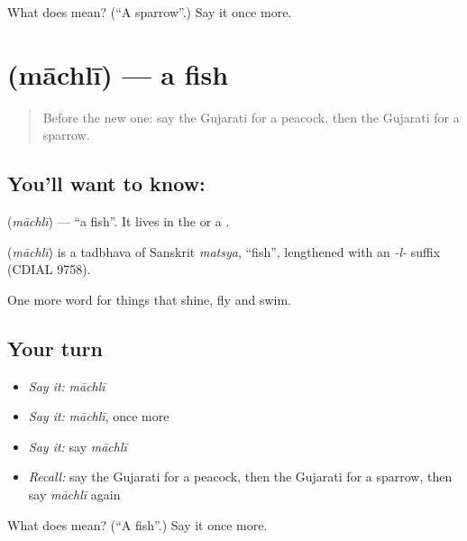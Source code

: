 \begin{tcolorbox}[breakable,colback=teal!4,colframe=teal!35!black,title={Before you move on}]
What does  mean? (\textquotedblleft{}A sparrow\textquotedblright{}.) Say it once more.
\end{tcolorbox}
\section[\texorpdfstring{\gu{માછલી} (māchlī)}{માછલી (māchlī)}]{ (māchlī) — a fish}

\label{lesson:GU-C69-fish}



\begin{quote}
Before the new one: say the Gujarati for a peacock, then the Gujarati for a sparrow.
\end{quote}

\subsection*{You'll want to know: }
\textbf{} (\emph{māchlī}) — \textquotedblleft{}a fish\textquotedblright{}. It lives in the \textbf{} or a \textbf{}.

\begin{cousinweb}
\textbf{} (\emph{māchlī}) is a tadbhava of Sanskrit \emph{matsya}, \textquotedblleft{}fish\textquotedblright{}, lengthened with an \emph{-l-} suffix (CDIAL 9758).
\end{cousinweb}

\begin{grammarlens}[title={What you've built}]
One more word for things that shine, fly and swim.
\end{grammarlens}

\subsection*{Your turn}
\begin{itemize}
\raggedright
  \item \emph{Say it:} \emph{māchlī}
  \item \emph{Say it:} \emph{māchlī}, once more
  \item \emph{Say it:} say \emph{māchlī}
  \item \emph{Recall:} say the Gujarati for a peacock, then the Gujarati for a sparrow, then say \emph{māchlī} again
\end{itemize}

\begin{tcolorbox}[breakable,colback=teal!4,colframe=teal!35!black,title={Before you move on}]
What does  mean? (\textquotedblleft{}A fish\textquotedblright{}.) Say it once more.
\end{tcolorbox}
